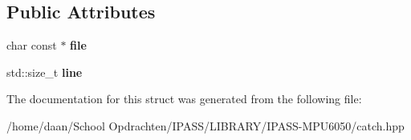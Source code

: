 \subsection*{Public Attributes}
\begin{DoxyCompactItemize}
\item 
\mbox{\label{structCatch_1_1SourceLineInfo_ad65537703e9f08c1fa7777fbc3f0c617}} 
char const  $\ast$ {\bfseries file}
\item 
\mbox{\label{structCatch_1_1SourceLineInfo_a841e5d696c7b9cde24e45e61dd979c77}} 
std\+::size\+\_\+t {\bfseries line}
\end{DoxyCompactItemize}


The documentation for this struct was generated from the following file\+:\begin{DoxyCompactItemize}
\item 
/home/daan/\+School Opdrachten/\+I\+P\+A\+S\+S/\+L\+I\+B\+R\+A\+R\+Y/\+I\+P\+A\+S\+S-\/\+M\+P\+U6050/catch.\+hpp\end{DoxyCompactItemize}
